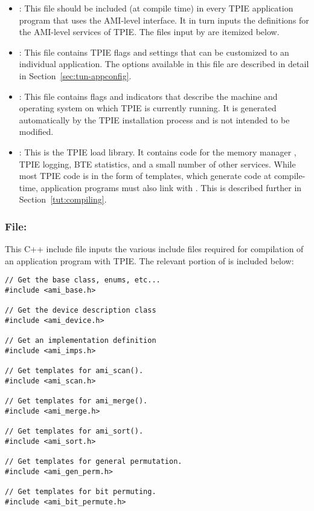 \begin{itemize}
    \item {}: This file should be included
    (at compile time) in every TPIE application program that
    uses the AMI-level interface. It in turn inputs the
    definitions for the AMI-level services of TPIE. The
    files input by  are itemized below.

    \item {}: This file contains TPIE
    flags and settings that can be customized to an
    individual application. The options available in this
    file are described in detail in
    Section~\ref{sec:tun-appconfig}.

    \item {}: This file contains flags and
    indicators that describe the machine and operating
    system on which TPIE is currently running. It is
    generated automatically by the TPIE installation
    process and is not intended to be modified.
    
    \item {}: This is the TPIE load
    library. It contains code for the memory manager
    , TPIE logging, BTE statistics, and a
    small number of other services. While most TPIE code is
    in the form of templates, which generate code at
    compile-time, application programs must also link with
    . This is described further in
    Section~\ref{tut:compiling}.
\end{itemize} 

\subsubsection{File: } This C++ include
file inputs the various include files required for
compilation of an application program with TPIE. The relevant portion
of  is included below:

\begin{verbatim}
// Get the base class, enums, etc...
#include <ami_base.h>

// Get the device description class
#include <ami_device.h>

// Get an implementation definition
#include <ami_imps.h>

// Get templates for ami_scan().
#include <ami_scan.h>

// Get templates for ami_merge().
#include <ami_merge.h>

// Get templates for ami_sort().
#include <ami_sort.h>

// Get templates for general permutation.
#include <ami_gen_perm.h>

// Get templates for bit permuting.
#include <ami_bit_permute.h>
\end{verbatim} 


